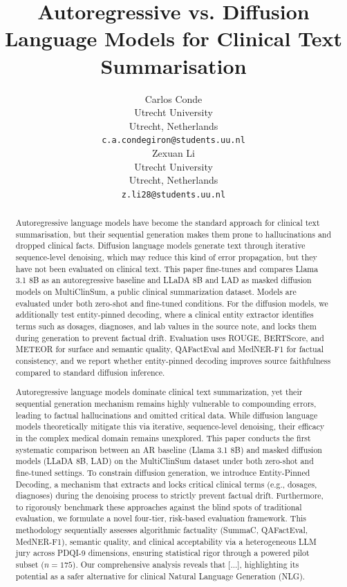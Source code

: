 \documentclass[11pt]{article}
\title{Autoregressive vs. Diffusion Language Models for Clinical Text Summarisation }
\author{Carlos Conde \\
  Utrecht University \\
  Utrecht, Netherlands \\
  \texttt{c.a.condegiron@students.uu.nl} \\\And
  Zexuan Li \\
  Utrecht University \\
  Utrecht, Netherlands \\
  \texttt{z.li28@students.uu.nl} \\}
\begin{document}
\maketitle
\begin{abstract}
Autoregressive language models have become the standard approach for clinical text summarisation, but their sequential generation makes them prone to hallucinations and dropped clinical facts. Diffusion language models generate text through iterative sequence-level denoising, which may reduce this kind of error propagation, but they have not been evaluated on clinical text. This paper fine-tunes and compares Llama 3.1 8B as an autoregressive baseline and LLaDA 8B and LAD as masked diffusion models on MultiClinSum, a public clinical summarization dataset. Models are evaluated under both zero-shot and fine-tuned conditions. For the diffusion models, we additionally test entity-pinned decoding, where a clinical entity extractor identifies terms such as dosages, diagnoses, and lab values in the source note, and locks them during generation to prevent factual drift. Evaluation uses ROUGE, BERTScore, and METEOR for surface and semantic quality, QAFactEval and MedNER-F1 for factual consistency, and we report whether entity-pinned decoding improves source faithfulness 
compared to standard diffusion inference.
\end{abstract}

\begin{abstract}
Autoregressive language models dominate clinical text summarization, yet their sequential generation mechanism remains highly vulnerable to compounding errors, leading to factual hallucinations and omitted critical data. While diffusion language models theoretically mitigate this via iterative, sequence-level denoising, their efficacy in the complex medical domain remains unexplored. This paper conducts the first systematic comparison between an AR baseline (Llama 3.1 8B) and masked diffusion models (LLaDA 8B, LAD) on the MultiClinSum dataset under both zero-shot and fine-tuned settings. To constrain diffusion generation, we introduce Entity-Pinned Decoding, a mechanism that extracts and locks critical clinical terms (e.g., dosages, diagnoses) during the denoising process to strictly prevent factual drift. Furthermore, to rigorously benchmark these approaches against the blind spots of traditional evaluation, we formulate a novel four-tier, risk-based evaluation framework. This methodology sequentially assesses algorithmic factuality (SummaC, QAFactEval, MedNER-F1), semantic quality, and clinical acceptability via a heterogeneous LLM jury across PDQI-9 dimensions, ensuring statistical rigor through a powered pilot subset ($n=175$). Our comprehensive analysis reveals that [...], highlighting its potential as a safer alternative for clinical Natural Language Generation (NLG).
\end{abstract}
\end{document}

